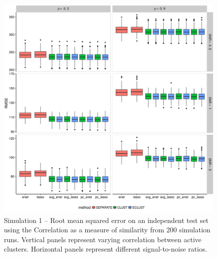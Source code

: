 \begin{appendices}
\begin{figure}[H]
	\centering
	\includegraphics[scale=0.6, keepaspectratio]{./figs/hydra/results/figures/sim1-sept10/RMSE_Correlation_sim1.png}
	\caption{Simulation 1 -- Root mean squared error on an independent test set using the Correlation as a measure of similarity from 200 simulation runs. Vertical panels represent varying correlation between active clusters. Horizontal panels represent different signal-to-noise ratios.}
	\label{fig:RMSE_Correlation_sim1}
\end{figure}


\end{appendices}
